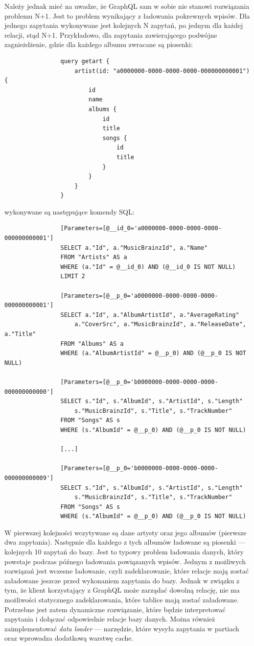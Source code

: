 			Należy jednak mieć na uwadze, że GraphQL sam w sobie nie stanowi rozwiązania problemu N+1.
			Jest to problem wynikający z ładowania pokrewnych wpisów.
			Dla jednego zapytania wykonywane jest kolejnych N zapytań, po jednym dla każdej relacji, stąd N+1.
			Przykładowo, dla zapytania zawierającego podwójne zagnieżdżenie, gdzie dla każdego albumu zwracane są piosenki:
			\begin{lstlisting}
				query getart {
					artist(id: "a0000000-0000-0000-0000-000000000001") {
						id
						name
						albums {
							id
							title
							songs {
								id
								title
							}
						}
					}
				}
			\end{lstlisting}
			wykonywane są następujące komendy SQL:
			\begin{lstlisting}
				[Parameters=[@__id_0='a0000000-0000-0000-0000-000000000001']
				SELECT a."Id", a."MusicBrainzId", a."Name"
				FROM "Artists" AS a
				WHERE (a."Id" = @__id_0) AND (@__id_0 IS NOT NULL)
				LIMIT 2

				[Parameters=[@__p_0='a0000000-0000-0000-0000-000000000001']
				SELECT a."Id", a."AlbumArtistId", a."AverageRating"
					a."CoverSrc", a."MusicBrainzId", a."ReleaseDate", a."Title"
				FROM "Albums" AS a
				WHERE (a."AlbumArtistId" = @__p_0) AND (@__p_0 IS NOT NULL)

				[Parameters=[@__p_0='b0000000-0000-0000-0000-000000000000']
				SELECT s."Id", s."AlbumId", s."ArtistId", s."Length"
					s."MusicBrainzId", s."Title", s."TrackNumber"
				FROM "Songs" AS s
				WHERE (s."AlbumId" = @__p_0) AND (@__p_0 IS NOT NULL)

				[...]

				[Parameters=[@__p_0='b0000000-0000-0000-0000-000000000009']
				SELECT s."Id", s."AlbumId", s."ArtistId", s."Length"
					s."MusicBrainzId", s."Title", s."TrackNumber"
				FROM "Songs" AS s
				WHERE (s."AlbumId" = @__p_0) AND (@__p_0 IS NOT NULL)
			\end{lstlisting}
			W pierwszej kolejności wczytywane są dane artysty oraz jego albumów (pierwsze dwa zapytania).
			Następnie dla każdego z tych albumów ładowane są piosenki --- kolejnych 10 zapytań do bazy.
			Jest to typowy problem ładowania danych, który powstaje podczas późnego ładowania powiązanych wpisów.
			Jednym z możliwych rozwiązań jest wczesne ładowanie, czyli zadeklarowanie, które relacje mają zostać załadowane jeszcze przed wykonaniem zapytania do bazy.
			Jednak w związku z tym, że klient korzystający z GraphQL może zarządać dowolną relację, nie ma możliwości statycznego zadeklarowania, które tablice mają zostać załadowane.
			Potrzebne jest zatem dynamiczne rozwiązanie, które będzie interpretować zapytania i dołączać odpowiednie relacje bazy danych.
			Można również zaimplementować \emph{data loader} --- narzędzie, które wysyła zapytania w partiach oraz wprowadza dodatkową warstwę cache.

